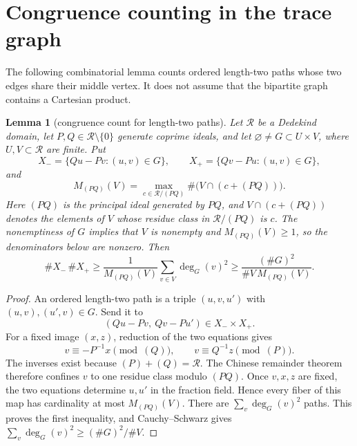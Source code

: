 \documentclass[11pt,reqno]{amsart}
\newtheorem{lemma}[theorem]{Lemma}
\theoremstyle{definition}
\theoremstyle{remark}
\begin{document}
\section{Congruence counting in the trace graph}
\label{sec:congruence-wedge}

The following combinatorial lemma counts ordered length-two paths whose two
edges share their middle vertex.  It does not assume that the bipartite
graph contains a Cartesian product.

\begin{lemma}[congruence count for length-two paths]
\label{lem:congruence-wedge}
Let \(\mathcal R\) be a Dedekind domain, let
\(P,Q\in\mathcal R\setminus\{0\}\) generate
coprime ideals, and let \(\varnothing\ne G\subset U\times V\), where
\(U,V\subset\mathcal R\) are finite.  Put
\[
 X_- =\{Qu-Pv:(u,v)\in G\},\qquad
 X_+ =\{Qv-Pu:(u,v)\in G\},
\]
and
\[
 M_{(PQ)}(V)=
 \max_{c\in\mathcal R/(PQ)}\#\bigl(V\cap(c+(PQ))\bigr).
\]
Here \((PQ)\) is the principal ideal generated by \(PQ\), and
\(V\cap(c+(PQ))\) denotes the elements of \(V\) whose residue class in
\(\mathcal R/(PQ)\) is \(c\).
The nonemptiness of \(G\) implies that \(V\) is nonempty and
\(M_{(PQ)}(V)\ge1\), so the denominators below are nonzero.
Then
\begin{equation}\label{eq:congruence-wedge}
 \#X_-\,\#X_+
 \ge \frac1{M_{(PQ)}(V)}\sum_{v\in V}\deg_G(v)^2
 \ge \frac{(\#G)^2}{\#V\,M_{(PQ)}(V)}.
\end{equation}
\end{lemma}

\begin{proof}
An ordered length-two path is a triple \((u,v,u')\) with
\((u,v),(u',v)\in G\).  Send it to
\[
 (Qu-Pv,\ Qv-Pu')\in X_-\times X_+.
\]
For a fixed image \((x,z)\), reduction of the two equations gives
\[
 v\equiv-P^{-1}x\pmod{(Q)},\qquad
 v\equiv Q^{-1}z\pmod{(P)}.
\]
The inverses exist because \((P)+(Q)=\mathcal R\).  The Chinese remainder theorem
therefore confines \(v\) to one residue class modulo \((PQ)\).  Once
\(v,x,z\) are fixed, the two equations determine \(u,u'\) in the fraction
field.  Hence every fiber of this map has cardinality at most
\(M_{(PQ)}(V)\).  There are \(\sum_v\deg_G(v)^2\) paths.  This proves the
first inequality, and Cauchy--Schwarz gives
\(\sum_v\deg_G(v)^2\ge(\#G)^2/\#V\).
\end{proof}
\end{document}
